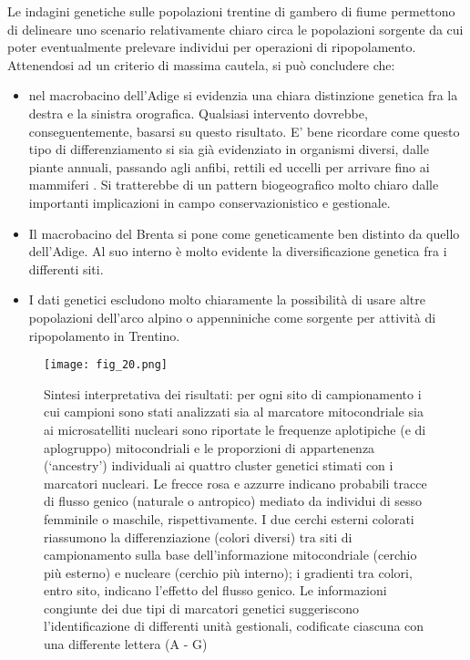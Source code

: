 \documentclass[11pt,a4paper,italian,twoside,openany]{memoir}
\begin{document}
Le indagini genetiche sulle popolazioni trentine di gambero di fiume permettono di delineare uno scenario relativamente chiaro circa le popolazioni sorgente da cui poter eventualmente prelevare individui per operazioni di ripopolamento. Attenendosi ad un criterio di massima cautela, si può concludere che:
\begin{itemize}\itemsep0pt
  \item nel macrobacino dell'Adige si evidenzia una chiara distinzione genetica fra la destra e la sinistra orografica. Qualsiasi intervento dovrebbe, conseguentemente, basarsi su questo risultato. E' bene ricordare come questo tipo di differenziamento si sia già evidenziato in organismi diversi, dalle piante annuali, passando agli anfibi, rettili ed uccelli per arrivare fino ai mammiferi \cite{Schonswetter 2004} \cite{Pecchioli 2006} \cite{Vernesi 2016}. Si tratterebbe di un pattern biogeografico molto chiaro dalle importanti implicazioni in campo conservazionistico e gestionale.
  \item Il macrobacino del Brenta si pone come geneticamente ben distinto da quello dell'Adige. Al suo interno è molto evidente la diversificazione genetica fra i differenti siti.
  \item I dati genetici escludono molto chiaramente la possibilità di usare altre popolazioni dell'arco alpino o appenniniche come sorgente per attività di ripopolamento in Trentino.
\end{itemize}

\begin{figure}
  \centering
  \texttt{[image: fig\_20.png]}
  \caption{Sintesi interpretativa dei risultati: per ogni sito di campionamento i cui campioni sono stati analizzati sia al marcatore mitocondriale sia ai microsatelliti nucleari sono riportate le frequenze aplotipiche (e di aplogruppo) mitocondriali e le proporzioni di appartenenza (‘ancestry') individuali ai quattro cluster genetici stimati con i marcatori nucleari. Le frecce rosa e azzurre indicano probabili tracce di flusso genico (naturale o antropico) mediato da individui di sesso femminile o maschile, rispettivamente. I due cerchi esterni colorati riassumono la differenziazione (colori diversi) tra siti di campionamento sulla base dell'informazione mitocondriale (cerchio più esterno) e nucleare (cerchio più interno); i gradienti tra colori, entro sito, indicano l'effetto del flusso genico. Le informazioni congiunte dei due tipi di marcatori genetici suggeriscono l'identificazione di differenti unità gestionali, codificate ciascuna con una differente lettera (A - G)}
  \label{fig_20}
\end{figure}
\end{document}
